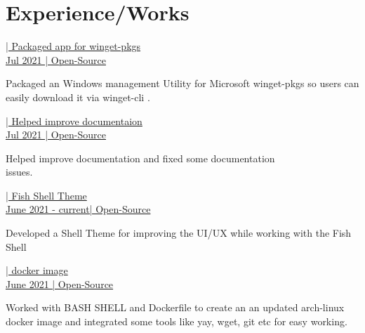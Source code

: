 \documentclass[]{deedy-resume-openfont}
\begin{document}
\begin{minipage}[t]{0.66\textwidth} 


\section{Experience/Works}

\href{https://github.com/microsoft/winget-pkgs/pull/19513}{| Packaged app for winget-pkgs }\\
\href{https://github.com/microsoft/winget-pkgs/pull/19513}{Jul 2021 | Open-Source}
\vspace{\topsep} %
\begin{tightemize}
\item Packaged an Windows management Utility for Microsoft winget-pkgs so users can easily download it via winget-cli .
\end{tightemize}
\sectionsep

\href{https://github.com/flameshot-org/flameshot}{| Helped improve documentaion }\\
\href{https://github.com/flameshot-org/flameshot}{Jul 2021 | Open-Source}
\vspace{\topsep} %
\begin{tightemize}
\item Helped improve documentation and fixed some documentation \\issues.
\end{tightemize}
\sectionsep


\href{https://github.com/creator54/mzish}{| Fish Shell Theme }\\
\href{https://github.com/creator54/mzish}{June 2021 - current| Open-Source}
\vspace{\topsep} %
\begin{tightemize}
\item Developed a Shell Theme for improving the UI/UX while working with the Fish Shell
\end{tightemize}
\sectionsep

\href{https://github.com/creator54/arch-latest}{| docker image }\\
\href{https://github.com/creator54/arch-latest}{June 2021 | Open-Source}
\vspace{\topsep} %
\begin{tightemize}
\item Worked with BASH SHELL and Dockerfile to create an an updated arch-linux docker image and integrated some tools like yay, wget, git etc for easy working.
\end{tightemize}
\sectionsep


\end{minipage}
\end{document}
